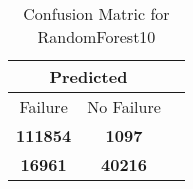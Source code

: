 \begin{table}[] 
\caption{Confusion Matric for RandomForest10} 
\label{Table: Prediction Accuracy-DMDRandomForest10OnlySunEKF-combinationReflectionEKF-top2perfectNoFailurePrediction-Reflection} 
\centering 
\begin{tabular} 
 {@{}ccc@{}} 
\toprule 
\multicolumn{2}{c}{\textbf{Predicted}}
 \\ \midrule 
\multicolumn{1}{|c|}{Failure} & 
\multicolumn{1}{c|}{No Failure}
 \\ \midrule 
\multicolumn{1}{|c|}{\color{green}\textbf{111854}} & 
\multicolumn{1}{c|}{\color{red}\textbf{1097}}
 \\ \midrule 
\multicolumn{1}{|c|}{\color{red}\textbf{16961}} & 
\multicolumn{1}{c|}{\color{green}\textbf{40216}}
 \\ \bottomrule 
\end{tabular} 
\end{table} 
